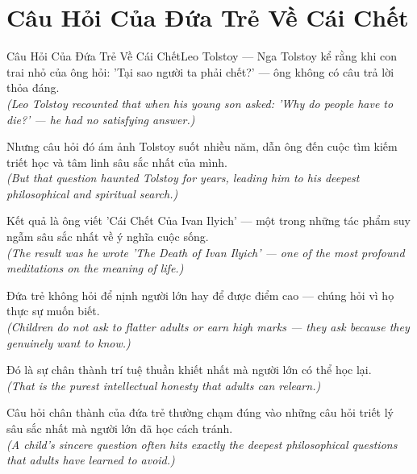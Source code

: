 \section{Câu Hỏi Của Đứa Trẻ Về Cái Chết}
\begin{truyen}{Câu Hỏi Của Đứa Trẻ Về Cái Chết}{Leo Tolstoy --- Nga}
 Tolstoy kể rằng khi con trai nhỏ của ông hỏi: 'Tại sao người ta phải chết?' --- ông không có câu trả lời thỏa đáng.\\[4pt]
\textit{(Leo Tolstoy recounted that when his young son asked: 'Why do people have to die?' --- he had no satisfying answer.)}

Nhưng câu hỏi đó ám ảnh Tolstoy suốt nhiều năm, dẫn ông đến cuộc tìm kiếm triết học và tâm linh sâu sắc nhất của mình.\\[4pt]
\textit{(But that question haunted Tolstoy for years, leading him to his deepest philosophical and spiritual search.)}

Kết quả là ông viết 'Cái Chết Của Ivan Ilyich' --- một trong những tác phẩm suy ngẫm sâu sắc nhất về ý nghĩa cuộc sống.\\[4pt]
\textit{(The result was he wrote 'The Death of Ivan Ilyich' --- one of the most profound meditations on the meaning of life.)}

Đứa trẻ không hỏi để nịnh người lớn hay để được điểm cao --- chúng hỏi vì họ thực sự muốn biết.\\[4pt]
\textit{(Children do not ask to flatter adults or earn high marks --- they ask because they genuinely want to know.)}

Đó là sự chân thành trí tuệ thuần khiết nhất mà người lớn có thể học lại.\\[4pt]
\textit{(That is the purest intellectual honesty that adults can relearn.)}

\end{truyen}
\begin{baihoc}
  Câu hỏi chân thành của đứa trẻ thường chạm đúng vào những câu hỏi triết lý sâu sắc nhất mà người lớn đã học cách tránh.\\[4pt]
  \textit{(A child's sincere question often hits exactly the deepest philosophical questions that adults have learned to avoid.)}
\end{baihoc}

